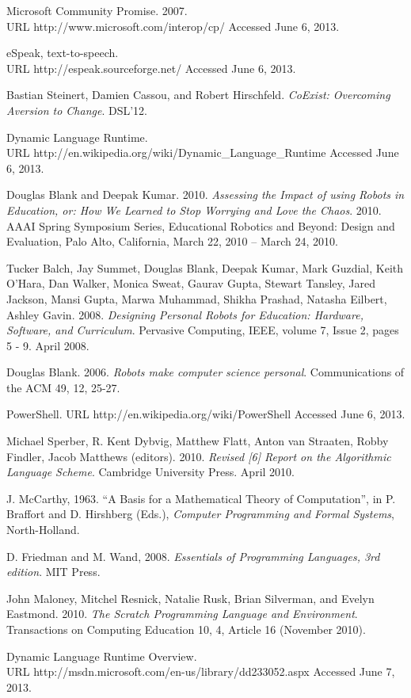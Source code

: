 \documentclass[preprint]{sigplanconf}
\begin{document}
\begin{thebibliography}{}
 Microsoft Community Promise. 2007.\\
URL http://www.microsoft.com/interop/cp/ Accessed June 6, 2013.

 eSpeak, text-to-speech.\\ URL http://espeak.sourceforge.net/ Accessed June 6, 2013.

 Bastian Steinert, Damien Cassou, and
  Robert Hirschfeld. \textit{CoExist: Overcoming Aversion to
    Change}. DSL'12.

 Dynamic Language Runtime.\\ URL
  http://en.wikipedia.org/wiki/Dynamic\_Language\_Runtime Accessed
  June 6, 2013.

 Douglas Blank and Deepak
  Kumar. 2010. \textit{Assessing the Impact of using Robots in
    Education, or: How We Learned to Stop Worrying and Love the
    Chaos}. 2010. AAAI Spring Symposium Series, Educational Robotics
  and Beyond: Design and Evaluation, Palo Alto, California, March 22,
  2010 – March 24, 2010.

 Tucker Balch, Jay Summet, Douglas Blank, Deepak Kumar,
  Mark Guzdial, Keith O'Hara, Dan Walker, Monica Sweat, Gaurav Gupta,
  Stewart Tansley, Jared Jackson, Mansi Gupta, Marwa Muhammad, Shikha
  Prashad, Natasha Eilbert, Ashley Gavin. 2008. \textit{Designing
    Personal Robots for Education: Hardware, Software, and
    Curriculum}. Pervasive Computing, IEEE, volume 7, Issue 2, pages 5
  - 9. April 2008.

 Douglas Blank. 2006. \textit{Robots make computer science
  personal}. Communications of the ACM 49, 12, 25-27.

 PowerShell. URL http://en.wikipedia.org/wiki/PowerShell Accessed June 6, 2013.

 Michael Sperber, R. Kent Dybvig, Matthew
  Flatt, Anton van Straaten, Robby Findler, Jacob Matthews
  (editors). 2010. \textit{Revised [6] Report on the Algorithmic Language
  Scheme}. Cambridge University Press. April 2010.

 J. McCarthy, 1963. ``A Basis for a Mathematical Theory
  of Computation'', in P. Braffort and D. Hirshberg (Eds.),
  \emph{Computer Programming and Formal Systems}, North-Holland.

 D. Friedman and M. Wand, 2008. \emph{Essentials of
  Programming Languages, 3rd edition}. MIT Press.

 John Maloney, Mitchel Resnick, Natalie Rusk, Brian
  Silverman, and Evelyn Eastmond. 2010. \textit{The Scratch Programming
  Language and Environment}. Transactions on Computing Education 10, 4,
  Article 16 (November 2010).

 Dynamic Language Runtime Overview. \\ URL
  http://msdn.microsoft.com/en-us/library/dd233052.aspx Accessed June
  7, 2013.

\end{thebibliography}
\end{document}
